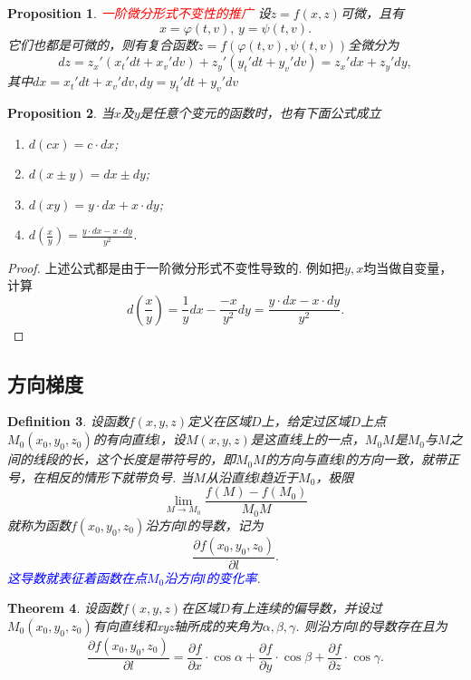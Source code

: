 \documentclass{article}
\newtheorem{theorem}{Theorem}[section]
\newtheorem{proposition}[theorem]{Proposition}
\newtheorem{definition}[theorem]{Definition}
\newcommand{\redt}[1]{\textcolor{red}{#1}}
\newcommand{\bluet}[1]{\textcolor{blue}{#1}}
\begin{document}
\begin{proposition}
\rm \redt{一阶微分形式不变性的推广} 设$z= f(x,z)$可微，且有
$$
x = \varphi(t,v),\, y = \psi(t,v).
$$
它们也都是可微的，则有复合函数$z=f(\varphi(t,v),\psi(t,v))$全微分为
$$
dz= z_x'(x_t'dt + x_v'dv) + z_y'(y_t'dt+y_v'dv) = z_x'dx + z_y'dy, 
$$
其中$dx = x_t'dt + x_v'dv,dy = y_t'dt+y_v'dv$
\end{proposition}

\begin{proposition}
\rm 当$x$及$y$是任意个变元的函数时，也有下面公式成立
\begin{enumerate}
	\item $d(cx)=c\cdot dx$;
	\item $d(x\pm y)=dx \pm dy$;
	\item $d(xy) = y\cdot dx + x\cdot dy$;
	\item $d(\frac{x}{y}) = \frac{y\cdot dx - x\cdot dy}{y^2}$.
\end{enumerate}
\end{proposition}

\begin{proof}
上述公式都是由于一阶微分形式不变性导致的. 例如把$y,x$均当做自变量，计算
$$
d(\frac{x}{y}) = \frac{1}{y}dx - \frac{-x}{y^2}dy = \frac{y\cdot dx - x\cdot dy}{y^2}.
$$
\end{proof}

\subsection{方向梯度}

\begin{definition}
\rm 设函数$f(x,y,z)$定义在区域$D$上，给定过区域$D$上点$M_0(x_0,y_0,z_0)$的有向直线$l$，设$M(x,y,z)$是这直线上的一点，$M_0M$是$M_0$与$M$之间的线段的长，这个长度是带符号的，即$M_0M$的方向与直线$l$的方向一致，就带正号，在相反的情形下就带负号. 当$M$从沿直线$l$趋近于$M_0$，极限
$$
\lim\limits_{M \to M_0} \frac{f(M)-f(M_0)}{M_0M}
$$
就称为函数$f(x_0,y_0,z_0)$沿方向$l$的导数，记为
$$
\frac{\partial f(x_0,y_0,z_0)}{\partial l}.
$$
\bluet{这导数就表征着函数在点$M_0$沿方向$l$的变化率}.
\end{definition}

\begin{theorem}
\rm 设函数$f(x,y,z)$在区域$D$有上连续的偏导数，并设过$M_0(x_0,y_0,z_0)$有向直线和xyz轴所成的夹角为$\alpha,\beta,\gamma$. 则沿方向$l$的导数存在且为
\begin{equation}
\frac{\partial f(x_0,y_0,z_0)}{\partial l} = \frac{\partial f}{\partial x}\cdot\cos \alpha + \frac{\partial f}{\partial y}\cdot\cos \beta + \frac{\partial f}{\partial z}\cdot\cos \gamma. 
\end{equation}
\end{theorem}
\end{document}
